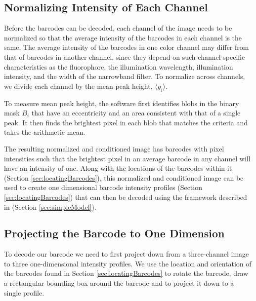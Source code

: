 \subsection{Normalizing Intensity of Each Channel}\label{sec:normalizePeakHeight}
Before the barcodes can be decoded, each channel of the image needs to be normalized so that the average intensity of the barcodes in each channel is the same.  The average intensity of the barcodes in one color channel may differ from that of barcodes in another channel, since they depend on such channel-specific characteristics as the fluorophore, the illumination wavelength, illumination intensity, and the width of  the narrowband filter. To normalize across channels, we divide each channel by the mean peak height,  $\langle g_i \rangle$. 

To measure mean peak height, the software first identifies blobs in the binary mask $B_i$ that have an eccentricity and an area consistent with that of a single peak. It then finds the brightest pixel in each blob that matches the criteria and takes the arithmetic mean. 

The resulting normalized and conditioned image has barcodes with pixel intensities such that the brightest pixel in an average barcode in any channel will have an intensity of one. Along with the locations of the barcodes within it (Section \ref{sec:locatingBarcodes}), this normalized and conditioned image can be used to create one dimensional barcode intensity profiles (Section \ref{sec:locatingBarcodes}) that can then be decoded using the framework described in (Section \ref{sec:simpleModel}).

  
\subsection{Projecting the Barcode to One Dimension} \label{sec:projectDown}
To decode our barcode we need to first project down from a three-channel image to three one-dimensional intensity profiles.  We use the location and orientation of the barcodes found in Section \ref{sec:locatingBarcodes} to rotate the barcode, draw a rectangular bounding box around the barcode and to project it down to a single profile.

